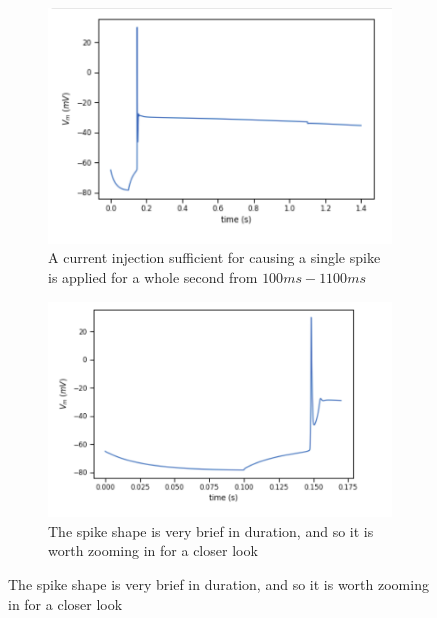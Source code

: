 \begin{figure}
\begin{center}


\centering
\begin{subfigure}{.2\textwidth}
  \centering
    \includegraphics[scale=0.5]{figures/correct_active_l5pc.png}
    \caption{A current injection sufficient for causing a single spike is applied for a whole second from $100ms-1100ms$}
  \label{fig:sub1}
\end{subfigure}

\centering
\begin{subfigure}{.2\textwidth}
  \centering
    \includegraphics[scale=0.5]{figures/spike_shape.png}
    \caption{The spike shape is very brief in duration, and so it is worth zooming in for a closer look}
  \label{fig:sub1}
\end{subfigure}



\end{center}
\end{figure}
